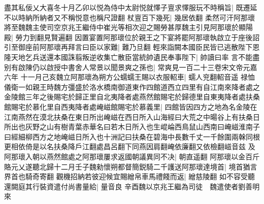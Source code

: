 盡其私佞乂大喜冬十月乙卯以悦為侍中太尉悦就懌子亶求懌服玩不時稱旨|{
	既遷延不以時納所納者又不稱悦意也稱尺證翻}
杖亶百下幾死|{
	幾居依翻}
柔然可汗阿那瓌將至魏魏主使司空京兆王繼侍中崔光等相次迎之賜勞甚厚魏主引見阿那瓌於顯陽殿|{
	勞力到翻見賢遍翻}
因置宴置阿那瓌位於親王之下宴將罷阿那瓌執啟立于座後詔引至御座前阿那瓌再拜言曰臣以家難|{
	難乃旦翻}
輕來詣闕本國臣民皆已逃散陛下恩隆天地乞兵送還本國誅翦叛逆收集亡散臣當統帥遺民奉事陛下|{
	帥讀曰率}
言不能盡别有啟陳仍以啟授中書舍人常景以聞景爽之孫也|{
	常爽見一百二十三卷宋文帝元嘉六年}
十一月己亥魏立阿那瓌為朔方公蠕蠕王賜以衣服軺車|{
	蠕人兖翻軺音遥}
禄恤儀衛一如親王時魏方彊盛於洛水橋南御道東作四館道西立四里有自江南來降者處之金陵館三年之後賜宅於歸正里自北夷降者處燕然館賜宅於歸德里自東夷降者處扶桑館賜宅於慕化里自西夷降者處崦嵫館賜宅於慕義里|{
	四館皆因四方之地為名金陵在江南燕然在漠北扶桑在東日所出崦嵫在西日所入山海經曰大荒之中暘谷上有扶桑日所出也灰野之山有樹青葉赤華名曰若木日所入也生崐崘西鳥鼠山西南曰崦嵫淮南子曰經細柳西方之地崦嵫日所入也十洲記曰扶桑在碧海中長數千丈一千餘圍兩榦同根更相依倚是以名扶桑降戶江翻處昌呂翻下同燕因肩翻崦依廉翻又依檢翻嵫音兹}
及阿那瓌入朝以燕然館處之阿那瓌屢求返國朝議異同不决|{
	朝直遥翻}
阿那瓌以金百斤賂元乂遂聽北歸十二月壬子魏勑懷朔都督簡鋭騎二千護送阿那瓌達境首|{
	境首猶言界首也騎奇寄翻}
觀機招納若彼迎候宜賜繒帛車馬禮餞而返|{
	繒慈陵翻}
如不容受聽還闕庭其行裝資遣付尚書量給|{
	量音良}
辛酉魏以京兆王繼為司徒　魏遣使者劉善明來

